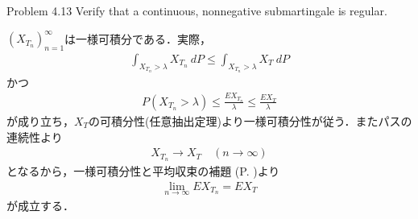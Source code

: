 	\begin{itembox}[l]{Problem 4.13}
		Verify that a continuous, nonnegative submartingale is regular. 
	\end{itembox}
	
	\begin{prf}
		$(X_{T_n})_{n=1}^\infty$は一様可積分である．実際，
		\begin{align}
			\int_{X_{T_n} > \lambda} X_{T_n}\ dP
			\leq \int_{X_{T_n} > \lambda} X_T\ dP
		\end{align}
		かつ
		\begin{align}
			P\left( X_{T_n} > \lambda \right)
			\leq \frac{EX_{T_n}}{\lambda}
			\leq \frac{EX_T}{\lambda}
		\end{align}
		が成り立ち，$X_T$の可積分性(任意抽出定理)より一様可積分性が従う．またパスの連続性より
		\begin{align}
			X_{T_n} \longrightarrow X_T
			\quad (n \longrightarrow \infty)
		\end{align}
		となるから，一様可積分性と平均収束の補題 (P. \pageref{lem:uniformly_integrable_and_convergence_in_mean})より
		\begin{align}
			\lim_{n \to \infty} EX_{T_n} = EX_T
		\end{align}
		が成立する．
		\QED
	\end{prf}
	